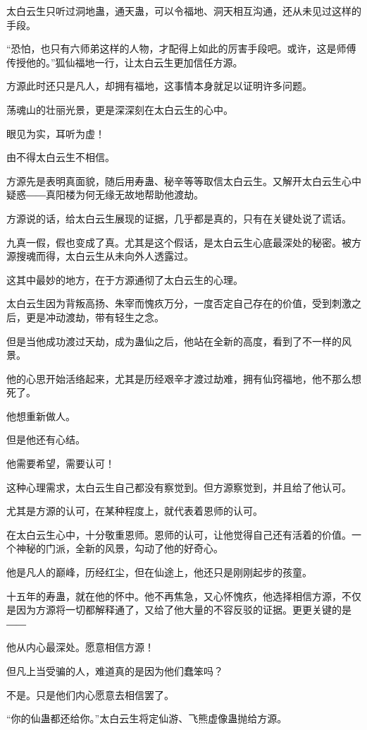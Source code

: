 \begin{this_body}
太白云生只听过洞地蛊，通天蛊，可以令福地、洞天相互沟通，还从未见过这样的手段。

“恐怕，也只有六师弟这样的人物，才配得上如此的厉害手段吧。或许，这是师傅传授他的。”狐仙福地一行，让太白云生更加信任方源。

方源此时还只是凡人，却拥有福地，这事情本身就足以证明许多问题。

荡魂山的壮丽光景，更是深深刻在太白云生的心中。

眼见为实，耳听为虚！

由不得太白云生不相信。

方源先是表明真面貌，随后用寿蛊、秘辛等等取信太白云生。又解开太白云生心中疑惑――真阳楼为何无缘无故地帮助他渡劫。

方源说的话，给太白云生展现的证据，几乎都是真的，只有在关键处说了谎话。

九真一假，假也变成了真。尤其是这个假话，是太白云生心底最深处的秘密。被方源搜魂而得，太白云生从未向外人透露过。

这其中最妙的地方，在于方源通彻了太白云生的心理。

太白云生因为背叛高扬、朱宰而愧疚万分，一度否定自己存在的价值，受到刺激之后，更是冲动渡劫，带有轻生之念。

但是当他成功渡过天劫，成为蛊仙之后，他站在全新的高度，看到了不一样的风景。

他的心思开始活络起来，尤其是历经艰辛才渡过劫难，拥有仙窍福地，他不那么想死了。

他想重新做人。

但是他还有心结。

他需要希望，需要认可！

这种心理需求，太白云生自己都没有察觉到。但方源察觉到，并且给了他认可。

尤其是方源的认可，在某种程度上，就代表着恩师的认可。

在太白云生心中，十分敬重恩师。恩师的认可，让他觉得自己还有活着的价值。一个神秘的门派，全新的风景，勾动了他的好奇心。

他是凡人的巅峰，历经红尘，但在仙途上，他还只是刚刚起步的孩童。

十五年的寿蛊，就在他的怀中。他不再焦急，又心怀愧疚，他选择相信方源，不仅是因为方源将一切都解释通了，又给了他大量的不容反驳的证据。更更关键的是――

他从内心最深处。愿意相信方源！

但凡上当受骗的人，难道真的是因为他们蠢笨吗？

不是。只是他们内心愿意去相信罢了。

“你的仙蛊都还给你。”太白云生将定仙游、飞熊虚像蛊抛给方源。


\end{this_body}
